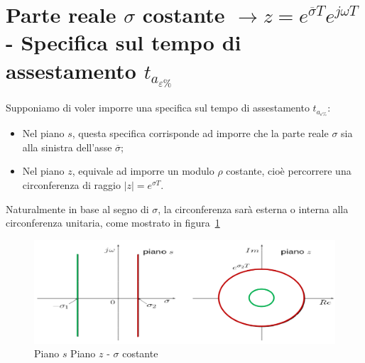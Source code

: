 \documentclass[a4paper]{report}
\begin{document}
\section{Parte reale $\sigma$ costante $\rightarrow z =
  e^{\overline{\sigma} T} e^{j \omega T}$ - Specifica sul tempo di
  assestamento $t_{a_{\varepsilon\%}}$}
Supponiamo di voler imporre una specifica sul tempo di assestamento
$t_{a_{\varepsilon\%}}$:
\begin{itemize}
\item Nel piano $s$, questa specifica corrisponde ad imporre che la
  parte reale $\sigma$ sia alla sinistra dell'asse $\overline{\sigma}$;
\item Nel piano $z$, equivale ad imporre un modulo $\rho$ costante,
cio\`e percorrere una circonferenza di raggio $|z| = e^{\sigma T}$.
\end{itemize}
Naturalmente in base al segno di $\sigma$, la circonferenza sar\`a
esterna o interna alla circonferenza unitaria, come mostrato in
figura~\ref{fig:pianoSsigmaCostante} 
\begin{figure}[!h]
  \begin{center}
    \includegraphics[scale=0.3]{./figures/pianoSsigmaCostante.png}
    \caption{Piano $s$ Piano $z$ - $\sigma$
      costante}\label{fig:pianoSsigmaCostante} 
  \end{center}
\end{figure}
\end{document}
